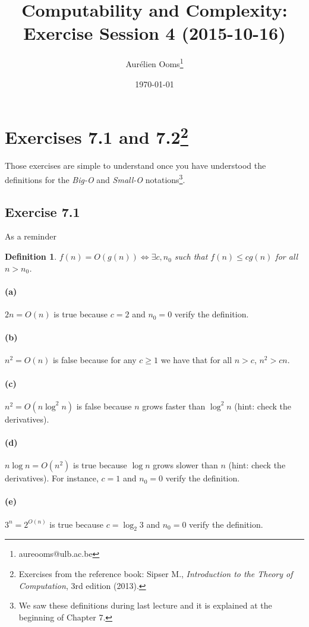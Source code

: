 \documentclass{article}
\title{Computability and Complexity:\\Exercise Session 4 (2015-10-16)}
\author{Aurélien Ooms\footnote{aureooms@ulb.ac.be}}
\date{\today}
\newcommand{\definitionname}{Definition}
\newtheorem{definition}{\definitionname}
\begin{document}
\maketitle
\tableofcontents

\section{Exercises 7.1 and 7.2\footnote{Exercises from the reference book: Sipser M.,
\emph{Introduction to the Theory of Computation}, 3rd edition (2013).}}
Those exercises are simple to understand once you have understood the definitions for the
\emph{Big-O} and \emph{Small-O} notations\footnote{We saw these definitions
during last lecture and it is explained at the beginning of Chapter 7.}.

\subsection{Exercise 7.1}
As a reminder
\begin{definition}
	\(f(n) = O(g(n)) \iff \exists c, n_0\) such that \(f(n) \le c g(n)\) for
	all \(n > n_0\).
\end{definition}

\paragraph{(a)}
\(2n = O(n)\)
is true because \(c = 2\) and \(n_0 = 0\) verify the definition.

\paragraph{(b)}
\(n^2 = O(n)\)
is false because for any \(c \ge 1\) we have that for all \(n > c\), \(n^2 > cn\).

\paragraph{(c)}
\(n^2 = O(n \log^2 n)\)
is false because $n$ grows faster than $\log^2 n$ (hint: check the derivatives).

\paragraph{(d)}
\(n \log n = O(n^2)\)
is true because $\log n$ grows slower than $n$ (hint: check the derivatives).
For instance, \(c = 1\) and \(n_0 = 0\) verify the definition.

\paragraph{(e)}
\(3^n = 2^{O(n)}\)
is true because \(c = \log_2 3\) and \(n_0 = 0\) verify the definition.
\end{document}
